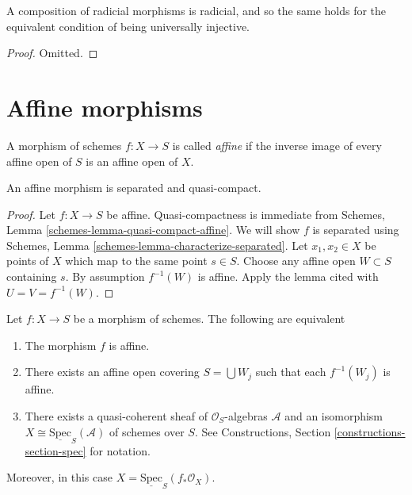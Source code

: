 \begin{lemma}
\label{lemma-composition-universally-injective}
A composition of radicial morphisms is radicial, and so the same holds
for the equivalent condition of being universally injective.
\end{lemma}

\begin{proof}
Omitted.
\end{proof}









\section{Affine morphisms}
\label{section-affine}

\begin{definition}
\label{definition-affine}
A morphism of schemes $f : X \to S$ is called {\it affine} if
the inverse image of every affine open of $S$ is an affine
open of $X$.
\end{definition}

\begin{lemma}
\label{lemma-affine-separated}
An affine morphism is separated and quasi-compact.
\end{lemma}

\begin{proof}
Let $f : X \to S$ be affine. Quasi-compactness is immediate from
Schemes, Lemma \ref{schemes-lemma-quasi-compact-affine}.
We will show $f$ is separated using
Schemes, Lemma \ref{schemes-lemma-characterize-separated}. Let
$x_1, x_2 \in X$ be points of $X$ which map to the same point $s \in S$.
Choose any affine open $W \subset S$ containing $s$. By assumption
$f^{-1}(W)$ is affine. Apply the lemma cited with $U = V = f^{-1}(W)$.
\end{proof}

\begin{lemma}
\label{lemma-characterize-affine}
Let $f : X \to S$ be a morphism of schemes.
The following are equivalent
\begin{enumerate}
\item The morphism $f$ is affine.
\item There exists an affine open covering $S = \bigcup W_j$
such that each $f^{-1}(W_j)$ is affine.
\item There exists a quasi-coherent sheaf of $\mathcal{O}_S$-algebras
$\mathcal{A}$ and an isomorphism
$X \cong \underline{\text{Spec}}_S(\mathcal{A})$
of schemes over $S$. See
Constructions, Section \ref{constructions-section-spec} for notation.
\end{enumerate}
Moreover, in this case $X = \underline{\text{Spec}}_S(f_*\mathcal{O}_X)$.
\end{lemma}

